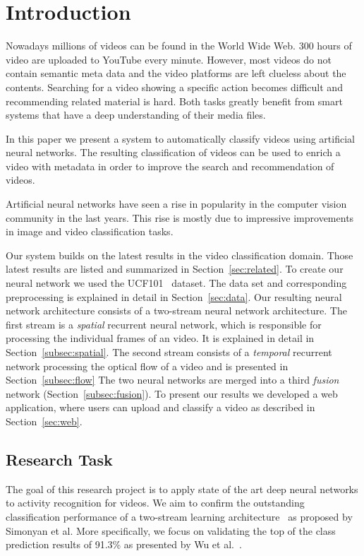 \section{Introduction}
\label{sec:introduction}

Nowadays millions of videos can be found in the World Wide Web.
300 hours of video are uploaded to YouTube every minute.
However, most videos do not contain semantic meta data and the video platforms are left clueless about the contents.
Searching for a video showing a specific action becomes difficult and recommending related material is hard.
Both tasks greatly benefit from smart systems that have a deep understanding of their media files. 

In this paper we present a system to automatically classify videos using artificial neural networks.
The resulting classification of videos can be used to enrich a video with metadata in order to improve the search and recommendation of videos.

Artificial neural networks have seen a rise in popularity in the computer vision community in the last years.
This rise is mostly due to impressive improvements in image and video classification tasks.

Our system builds on the latest results in the video classification domain.
Those latest results are listed and summarized in Section~\ref{sec:related}.
To create our neural network we used the UCF101~\cite{soomro2012ucf101} dataset.
The data set and corresponding preprocessing is explained in detail in Section~\ref{sec:data}.
Our resulting neural network architecture consists of a two-stream neural network architecture.
The first stream is a \emph{spatial} recurrent  neural network, which is responsible for processing the individual frames of an video.
It is explained in detail in Section~\ref{subsec:spatial}.
The second stream consists of a \emph{temporal} recurrent  network processing the optical flow of a video and is presented in Section~\ref{subsec:flow}
The two neural networks are merged into a third \emph{fusion} network (Section~\ref{subsec:fusion}).
To present our results we developed a web application, where users can upload and classify a video as described in Section~\ref{sec:web}.

\subsection*{Research Task}
The goal of this research project is to apply state of the art deep neural networks to activity recognition for videos.
We aim to confirm the outstanding classification performance of a two-stream learning architecture~\cite{simonyan2014two} as proposed by Simonyan et al.
More specifically, we focus on validating the top of the class prediction results of 91.3\% as presented by Wu et al.~\cite{wu2015modeling}.